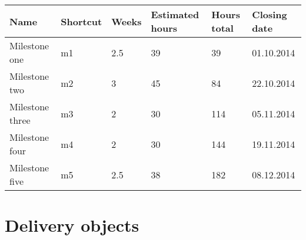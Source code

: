 	\begin{tabular}{ | p{3cm} | p{2cm} | p{2cm} | p{2cm} | p{2cm} | p{2cm} |}
	\hline
	\textbf{Name} & \textbf{Shortcut} & \textbf{Weeks} & \textbf{Estimated hours} & \textbf{Hours  \mbox{total}} & \textbf{Closing date} \\ \hline
	Milestone one & m1 & 2.5 & 39 & 39 & 01.10.2014 \\
	Milestone two & m2 & 3 & 45 & 84 & 22.10.2014 \\
	Milestone three & m3 & 2 & 30 & 114 & 05.11.2014 \\
	Milestone four & m4 & 2 & 30 & 144 & 19.11.2014 \\
	Milestone five & m5 & 2.5 & 38 & 182 & 08.12.2014 \\
	\hline
	\end{tabular}


\section{Delivery objects}

